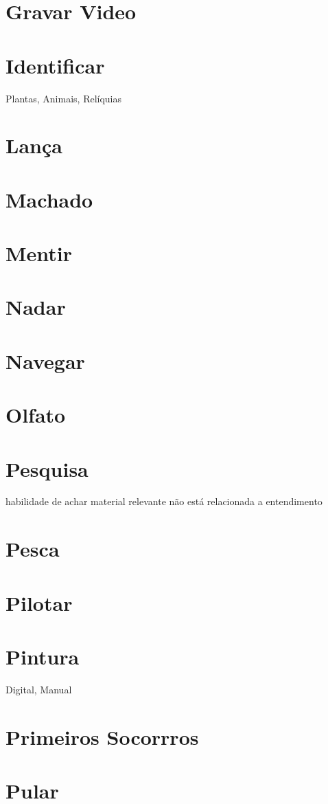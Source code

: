 \section{Gravar Video}
\section{Identificar} Plantas, Animais, Relíquias 
\section{Lança}
\section{Machado}
\section{Mentir}
\section{Nadar}
\section{Navegar}%
\section{Olfato}
\section{Pesquisa} habilidade de achar material relevante não está relacionada a entendimento %
\section{Pesca}
\section{Pilotar}
\section{Pintura} Digital, Manual
\section{Primeiros Socorrros}
\section{Pular}
